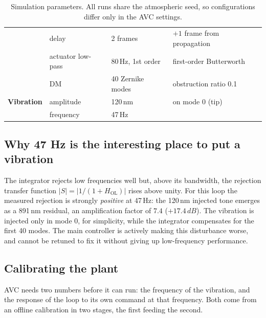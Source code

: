 \documentclass[11pt]{article}
\newcommand{\SI}[2]{#1\,#2}
\begin{document}
\begin{table}
\begin{tabular}{llll}
 & delay                 & 2 frames         & $+1$ frame from propagation\\
 & actuator low-pass     & \SI{80}{Hz}, 1st order & first-order Butterworth\\
 & DM                    & 40 Zernike modes & obstruction ratio 0.1\\
\midrule
\textbf{Vibration}
 & amplitude             & \SI{120}{nm}     & on mode 0 (tip)\\
 & frequency             & \SI{47}{Hz}      & \\
\bottomrule
\end{tabular}
\caption{Simulation parameters.
%
All runs share the atmospheric seed, so configurations differ only in the AVC settings.}
\label{tab:params}
\end{table}

\subsection{Why 47 Hz is the interesting place to put a vibration}
\label{sec:47hz}

The integrator rejects low frequencies well but, above its bandwidth, the rejection transfer function $|S|=|1/(1+H_{\text{OL}})|$ rises above unity.
%
For this loop the measured rejection is strongly \emph{positive} at \SI{47}{Hz}: the \SI{120}{nm} injected tone emerges as a \SI{891}{nm} residual, an amplification factor of $7.4$ ($+\SI{17.4}{dB}$).
%
The vibration is injected only in mode 0, for simplicity, while the integrator compensates for the first 40 modes.
%
The main controller is actively making this disturbance worse, and cannot be retuned to fix it without giving up low-frequency performance.
%

\subsection{Calibrating the plant}
\label{sec:calib}

AVC needs two numbers before it can run: the frequency of the vibration, and the response of the loop to its own command at that frequency.
%
Both come from an offline calibration in two stages, the first feeding the second.
\end{document}
